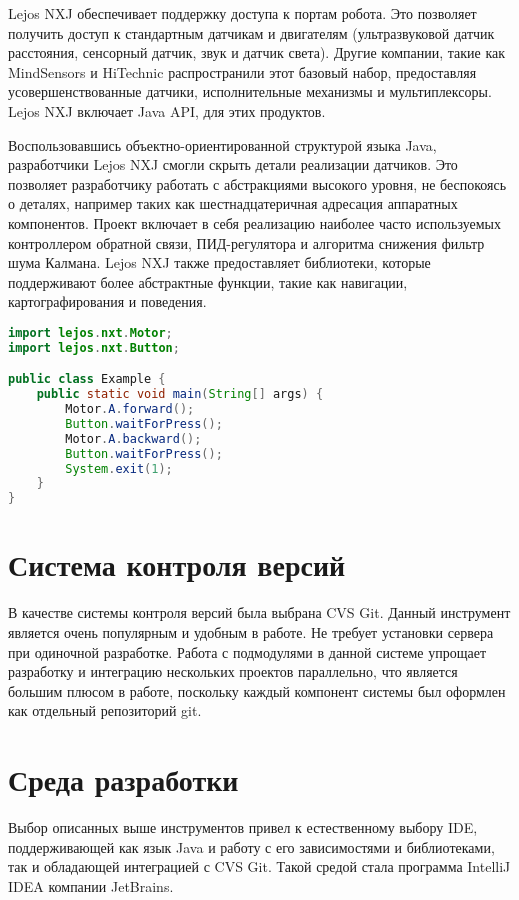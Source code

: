 Lejos NXJ обеспечивает поддержку доступа к портам робота. Это позволяет получить доступ к стандартным датчикам и двигателям (ультразвуковой датчик расстояния, сенсорный датчик, звук и датчик света). Другие компании, такие как MindSensors и HiTechnic распространили этот базовый набор, предоставляя усовершенствованные датчики, исполнительные механизмы и мультиплексоры. Lejos NXJ включает Java API, для этих продуктов.

Воспользовавшись объектно-ориентированной структурой языка Java, разработчики Lejos NXJ смогли скрыть детали реализации датчиков. Это позволяет разработчику работать с абстракциями высокого уровня, не беспокоясь о деталях, например таких как шестнадцатеричная адресация аппаратных компонентов. Проект включает в себя реализацию наиболее часто используемых контроллером обратной связи, ПИД-регулятора и алгоритма снижения фильтр шума Калмана. Lejos NXJ также предоставляет библиотеки, которые поддерживают более абстрактные функции, такие как навигации, картографирования и поведения.

\begin{lstlisting}[caption={Пример кода для работы с двигателями}, language=Java]
import lejos.nxt.Motor;
import lejos.nxt.Button;

public class Example {
    public static void main(String[] args) {
        Motor.A.forward();
        Button.waitForPress();
        Motor.A.backward();
        Button.waitForPress();
        System.exit(1);
    }
}
\end{lstlisting}


\section{Система контроля версий}

В качестве системы контроля версий была выбрана CVS Git. Данный инструмент является очень популярным и удобным в работе. Не требует установки сервера при одиночной разработке. Работа с подмодулями в данной системе упрощает разработку и интеграцию нескольких проектов параллельно, что является большим плюсом в работе, поскольку каждый компонент системы был оформлен как отдельный репозиторий git.


\section{Среда разработки}
Выбор описанных выше инструментов привел к естественному выбору IDE, поддерживающей как язык Java и работу с его зависимостями и библиотеками, так и обладающей интеграцией с CVS Git. Такой средой стала программа IntelliJ IDEA компании JetBrains. 

